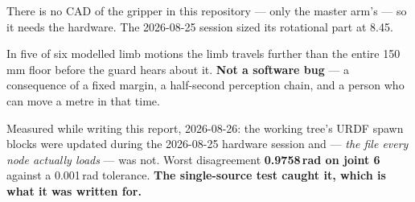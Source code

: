 {There is no CAD of the gripper in this repository --- only the master arm's ---
so it needs the hardware. The 2026-08-25 session sized its rotational part at
8.45\dg.}

{In five of six modelled limb motions the limb travels further than the entire
150\,mm floor before the guard hears about it. \textbf{Not a software bug} --- a
consequence of a fixed margin, a half-second perception chain, and a person who
can move a metre in that time.}

{Measured while writing this report, 2026-08-26: the working tree's URDF spawn
blocks were updated during the 2026-08-25 hardware session and
 --- \emph{the file every node actually
loads} --- was not. Worst disagreement \textbf{0.9758\,rad on joint 6} against a
0.001\,rad tolerance. \textbf{The single-source test caught it, which is what it
was written for.}}
